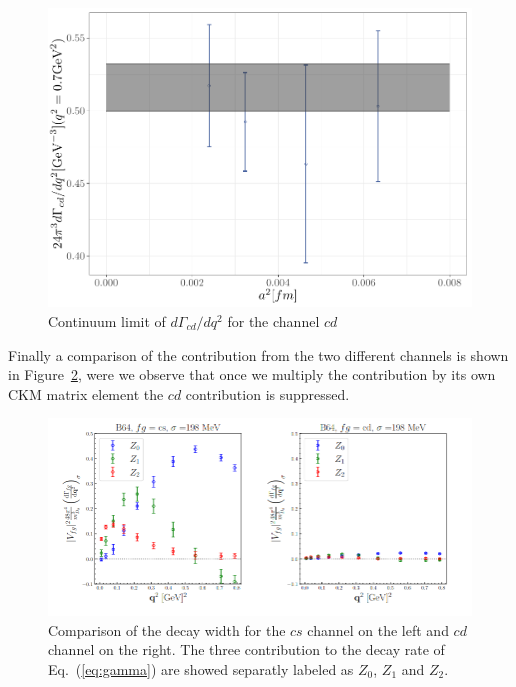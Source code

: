 \documentclass [a4paper, 11pt]{article}
\begin{document}
\begin{figure}
	\begin{center}
		\includegraphics[scale=0.7]{figures/dGamma_continuum_th9.pdf}
		\caption{Continuum limit of $d\Gamma_{cd}/dq^2 $ for the channel $cd$}
		\label{fig:dGamma_continuum}
	\end{center}
\end{figure}

Finally a comparison of the contribution from the two different channels is shown in Figure~\ref{fig:gamma_cs_cd}, were we observe that once we multiply the contribution by its own CKM matrix element the $cd$ contribution is suppressed.

\begin{figure}
	\begin{center}
		\includegraphics[scale=0.6]{figures/Screenshot from 2024-07-27 19-31-31.png}
		\caption{Comparison of the decay width for the $cs$ channel on the left and $cd$ channel on the right. The three contribution to the decay rate of Eq.~(\ref{eq:gamma}) are showed separatly labeled as $Z_0$, $Z_1$ and $Z_2$.}
		\label{fig:gamma_cs_cd}
	\end{center}
\end{figure}
\end{document}
